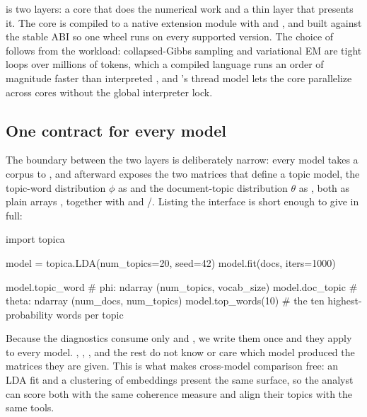 \documentclass[article]{jss}
\begin{document}
 is two layers: a  core that does the numerical work
and a thin  layer that presents it. The core is compiled to a
native extension module with  \citep{pyo3} and 
\citep{maturin}, and built against the stable ABI so one wheel runs on every
supported  version. The choice of  follows from
the workload: collapsed-Gibbs sampling and variational EM are tight loops over
millions of tokens, which a compiled language runs an order of magnitude faster
than interpreted , and 's thread model lets the
core parallelize across cores without the global interpreter lock.

\subsection{One contract for every model}

The boundary between the two layers is deliberately narrow: every model takes a
corpus to , and afterward exposes the two matrices that define a topic
model, the topic-word distribution $\phi$ as  and the
document-topic distribution $\theta$ as , both as plain
 arrays \citep{harris2020numpy}, together with  and
/. Listing the interface is short enough to give in full:

\begin{CodeChunk}
\begin{CodeInput}
import topica

model = topica.LDA(num_topics=20, seed=42)
model.fit(docs, iters=1000)

model.topic_word        # phi: ndarray (num_topics, vocab_size)
model.doc_topic         # theta: ndarray (num_docs, num_topics)
model.top_words(10)     # the ten highest-probability words per topic
\end{CodeInput}
\end{CodeChunk}

Because the diagnostics consume only  and ,
we write them once and they apply to every model. ,
, , and the rest do not
know or care which model produced the matrices they are given. This is what makes
cross-model comparison free: an LDA fit and a clustering of embeddings present
the same surface, so the analyst can score both with the same coherence measure
and align their topics with the same tools.
\end{document}
